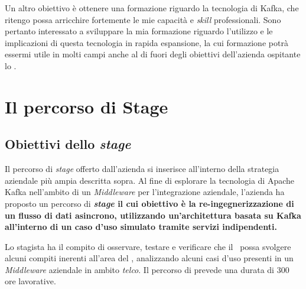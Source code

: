 Un altro obiettivo è ottenere una formazione riguardo la tecnologia di Kafka, che ritengo possa arricchire fortemente le mie capacità e \textit{skill} professionali.
Sono pertanto interessato a sviluppare la mia formazione riguardo l'utilizzo e le implicazioni di questa tecnologia in rapida espansione, la cui formazione potrà essermi utile in molti campi anche al di fuori degli obiettivi dell'azienda ospitante lo \stage.


\section{Il percorso di Stage}


%
%

\subsection{Obiettivi dello \textit{stage}}
\label{sub:obiettivi_stage}
Il percorso di \textit{stage} offerto dall'azienda si inserisce all'interno della strategia aziendale più ampia descritta sopra.
Al fine di esplorare la tecnologia di Apache Kafka nell'ambito di un \textit{Middleware} per l'integrazione aziendale, l'azienda ha proposto un percorso di \textbf{\textit{stage} il cui obiettivo è la re-ingegnerizzazione di un flusso di dati asincrono, utilizzando un'architettura basata su Kafka all'interno di un caso d'uso simulato tramite servizi indipendenti.}

Lo stagista ha il compito di osservare, testare e verificare che il \software\ possa svolgere alcuni compiti inerenti all'area del , analizzando alcuni casi d'uso presenti in un \textit{Middleware} aziendale in ambito \textit{telco}.
Il percorso di prevede una durata di 300 ore lavorative.

